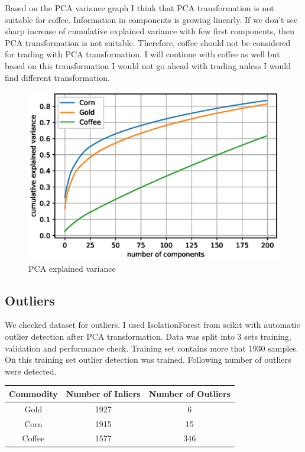 \documentclass[final,2p]{elsarticle}
\begin{document}
Based on the PCA variance graph I think that PCA transformation is not suitable for coffee. Information in components is growing linearly. If we don't see sharp increase of cumulative explained variance with few first components, then PCA transformation is not suitable. Therefore, coffee should not be considered for trading with PCA transformation. I will continue with coffee as well but based on this transformation I would not go ahead with trading unless I would find different transformation.
\begin{figure}[h]
    \centering
    \includegraphics[width = 5in]{figures/pca.eps}
    \caption{PCA explained variance}
\end{figure}

\subsection{Outliers}
We checked dataset for outliers. I used IsolationForest from scikit with automatic outlier detection after PCA transformation.
Data was split into 3 sets training, validation and performance check.
Training set contains more that $1930$ samples. On this training set outlier detection was trained.
Following number of outliers were detected.

\begin{center}
\begin{tabular}{ccc}
    Commodity & Number of Inliers & Number of Outliers \\
    \hline
    Gold & 1927 & 6 \\
    Corn & 1915 & 15 \\
    Coffee & 1577 & 346 \\
\end{tabular}
\end{center}
\end{document}
